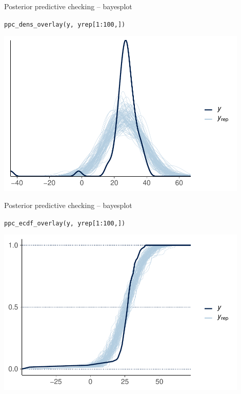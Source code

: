\documentclass[t]{beamer}
\begin{document}
\begin{frame}{Posterior predictive checking -- bayesplot}

  \vspace{-1\baselineskip}
  \texttt{ppc\_dens\_overlay(y, yrep[1:100,])}
  
  \includegraphics[height=8cm]{Newcomb_ppc_dens_overlay.pdf}

\end{frame}

\begin{frame}{Posterior predictive checking -- bayesplot}

  \vspace{-1\baselineskip}
  \texttt{ppc\_ecdf\_overlay(y, yrep[1:100,])}
  
  \includegraphics[height=8cm]{Newcomb_ppc_ecdf_overlay.pdf}

\end{frame}
\end{document}
